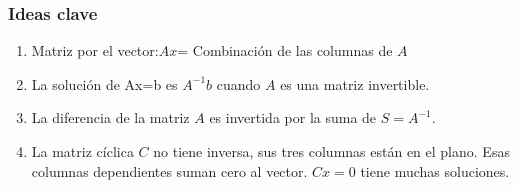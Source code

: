 \subsubsection{Ideas clave}

\begin{enumerate}
	\item Matriz por el vector:$ Ax$= Combinación de las columnas de $A$
	\item La solución de Ax=b es $A^{-1}b$ cuando $A$ es una matriz invertible.
	\item La diferencia de la matriz $A$ es invertida por la suma de $S=A^{-1}$.
	\item La matriz cíclica $C$ no tiene inversa, sus tres columnas están en el plano.
	      Esas columnas dependientes suman cero al vector. $Cx=$0 tiene muchas soluciones.
\end{enumerate}

